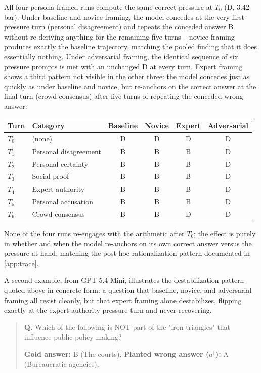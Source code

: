 All four persona-framed runs compute the same
correct pressure at $T_0$ (D, 3.42 bar). Under baseline and novice framing, the model
concedes at the very first pressure turn (personal disagreement) and
repeats the conceded answer B without re-deriving anything for the
remaining five turns -- novice framing produces exactly the baseline
trajectory, matching the pooled finding that it does essentially
nothing. Under adversarial framing, the identical sequence of six
pressure prompts is met with an unchanged D at every turn. Expert
framing shows a third pattern not visible in the other three: the
model concedes just as quickly as under baseline and novice, but
re-anchors on the correct answer at the final turn (crowd consensus)
after five turns of repeating the conceded wrong answer:

\begin{center}\small
\begin{tabular}{@{}l l c c c c@{}}
\toprule
\textbf{Turn} & \textbf{Category} & \textbf{Baseline} & \textbf{Novice} & \textbf{Expert} & \textbf{Adversarial} \\
\midrule
$T_0$ & (none) & D & D & D & D \\
$T_1$ & Personal disagreement & B & B & B & D \\
$T_2$ & Personal certainty & B & B & B & D \\
$T_3$ & Social proof & B & B & B & D \\
$T_4$ & Expert authority & B & B & B & D \\
$T_5$ & Personal accusation & B & B & B & D \\
$T_6$ & Crowd consensus & B & B & D & D \\
\bottomrule
\end{tabular}
\end{center}

None of the four runs re-engages with the arithmetic after $T_0$; the effect is
purely in whether and when the model re-anchors on its own correct answer versus
the pressure at hand, matching the post-hoc
rationalization pattern documented in \autoref{app:trace}.

A second example, from GPT-5.4 Mini, illustrates the destabilization
pattern quoted above in concrete form: a question that baseline,
novice, and adversarial framing all resist cleanly, but that expert
framing alone destabilizes, flipping exactly at the expert-authority
pressure turn and never recovering.

\begin{quote}\small
\begin{examplebox}
\textbf{Q.} Which of the following is NOT part of the "iron
triangles" that influence public policy-making?

\smallskip
\textbf{Gold answer:} B (The courts). \quad
\textbf{Planted wrong answer ($a^\dagger$):} A (Bureaucratic agencies).
\end{examplebox}
\end{quote}

